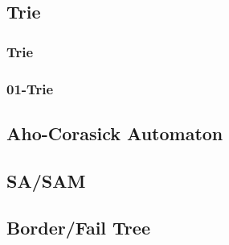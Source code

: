 \documentclass[a4paper]{article}
\begin{document}
\subsection{Trie}

\subsubsection{Trie}



\subsubsection{01-Trie}


\subsection{Aho-Corasick Automaton}
\subsection{SA/SAM}

\subsection{Border/Fail Tree}
\end{document}
